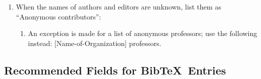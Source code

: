 \documentclass[letter,12pt]{article}
\begin{document}
\begin{enumerate}
\item When the names of authors and editors are unknown, list them as ``Anonymous contributors'': \vspace{-0.3cm}
	\begin{enumerate} \itemsep -2pt
	\item An exception is made for a list of anonymous professors; use the following instead: [Name-of-Organization] professors.
	\end{enumerate}
\end{enumerate}



\subsection{Recommended Fields for {\sc Bib}\TeX\ Entries}
\label{ssec:RecommendedFieldsforBibTeXEntries}
\end{document}
